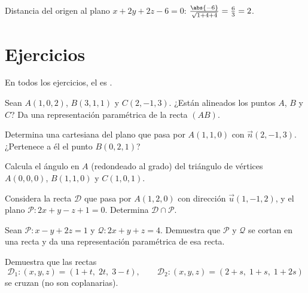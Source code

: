\begin{example}\label{ex:g12:space:distance}
Distancia del origen al plano $x + 2y + 2z - 6 = 0$:
$\frac{\abs{-6}}{\sqrt{1 + 4 + 4}} = \frac63 = 2$.
\end{example}

\section{Ejercicios}

En todos los ejercicios, el  es .

\begin{exercise}[$\star$]\label{exo:g12:space:1}
Sean $A(1, 0, 2)$, $B(3, 1, 1)$ y $C(2, -1, 3)$. ¿Están alineados los
puntos $A$, $B$ y $C$? Da una representación paramétrica de la recta
$(AB)$.
\end{exercise}

\begin{exercise}[$\star$]\label{exo:g12:space:2}
Determina una  cartesiana del plano que pasa por $A(1, 1, 0)$ con
 $\vec n(2, -1, 3)$. ¿Pertenece a él el punto $B(0, 2, 1)$?
\end{exercise}

\begin{exercise}[$\star$]\label{exo:g12:space:3}
Calcula el ángulo en $A$ (redondeado al grado) del triángulo de vértices
$A(0,0,0)$, $B(1, 1, 0)$ y $C(1, 0, 1)$.
\end{exercise}

\begin{exercise}[$\star\star$]\label{exo:g12:space:4}
Considera la recta $\mathcal D$ que pasa por $A(1, 2, 0)$ con dirección
$\vec u(1, -1, 2)$, y el plano $\mathcal P : 2x + y - z + 1 = 0$.
Determina $\mathcal D \cap \mathcal P$.
\end{exercise}

\begin{exercise}[$\star\star$]\label{exo:g12:space:5}
Sean $\mathcal P : x - y + 2z = 1$ y $\mathcal Q : 2x + y + z = 4$.
Demuestra que $\mathcal P$ y $\mathcal Q$ se cortan en una recta y da una
representación paramétrica de esa recta.
\end{exercise}

\begin{exercise}[$\star\star$]\label{exo:g12:space:6}
Demuestra que las rectas
\[
\mathcal D_1 : (x, y, z) = (1 + t,\; 2t,\; 3 - t), \qquad
\mathcal D_2 : (x, y, z) = (2 + s,\; 1 + s,\; 1 + 2s)
\]
se cruzan (no son coplanarias).
\end{exercise}

